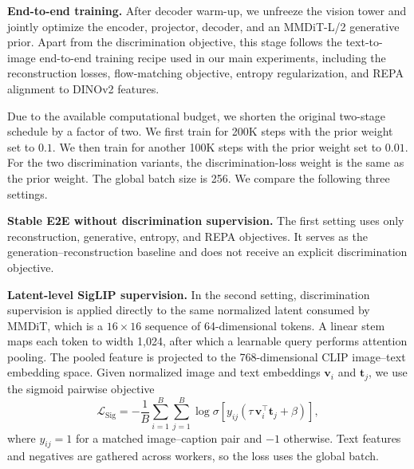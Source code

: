 \textbf{End-to-end training.}
After decoder warm-up, we unfreeze the vision tower and jointly optimize the encoder, projector, decoder, and an MMDiT-L/2 generative prior. Apart from the discrimination objective, this stage follows the text-to-image end-to-end training recipe used in our main experiments, including the reconstruction losses, flow-matching objective, entropy regularization, and REPA alignment to DINOv2 features.

Due to the available computational budget, we shorten the original two-stage schedule by a factor of two. 
We first train for 200K steps with the prior weight set to \(0.1\).
We then train for another 100K steps with the prior weight set to \(0.01\).
For the two discrimination variants, the discrimination-loss weight is the same as the prior weight. 
The global batch size is 256. 
We compare the following three settings.

\textbf{Stable E2E without discrimination supervision.}
The first setting uses only reconstruction, generative, entropy, and REPA
objectives.
It serves as the generation--reconstruction baseline and does not receive an
explicit discrimination objective.

\textbf{Latent-level SigLIP supervision.}
In the second setting, discrimination supervision is applied directly to the same normalized latent consumed by MMDiT, which is a \(16\times16\) sequence of 64-dimensional tokens. 
A linear stem maps each token to width 1,024, after which a learnable query performs attention pooling. 
The pooled feature is projected to the 768-dimensional CLIP image--text embedding space.
Given normalized image and text embeddings \(\mathbf{v}_i\) and \(\mathbf{t}_j\), we use the sigmoid pairwise objective~\cite{zhai2023sigmoid}
\begin{equation}
    \mathcal{L}_{\mathrm{Sig}}
    =
    -\frac{1}{B}
    \sum_{i=1}^{B}\sum_{j=1}^{B}
    \log \sigma
    \left[
        y_{ij}
        \left(
            \tau\,\mathbf{v}_i^\top\mathbf{t}_j+\beta
        \right)
    \right],
\end{equation}
where \(y_{ij}=1\) for a matched image--caption pair and \(-1\) otherwise.
Text features and negatives are gathered across workers, so the loss uses the global batch.

